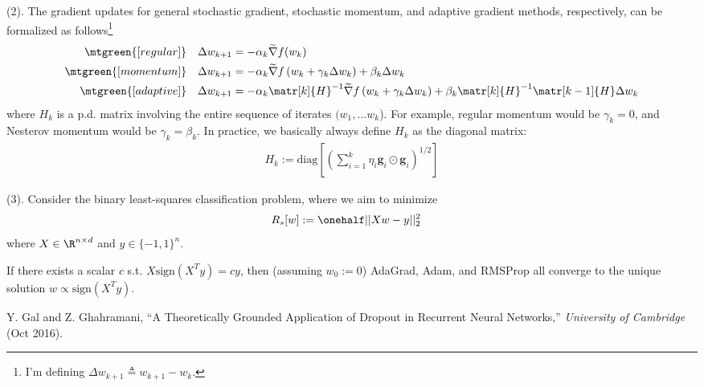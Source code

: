 \documentclass[11pt]{article}
\renewcommand\vec[2][]{\bm{#2}_{#1}}
\newcommand\myspace[1][]{\vspace{#1\bigskipamount}}
\newcommand\p{\Needspace{10\baselineskip} \noindent}
\begin{document}
\myspace
\p {} (2). The gradient updates for general stochastic gradient, stochastic momentum, and adaptive gradient methods, respectively, can be formalized as follows\footnote{I'm defining $\Delta w_{k + 1} \triangleq w_{k + 1} - w_k$.}
\begin{align}
	\mtgreen{[regular]} 	\quad	\Delta w_{k + 1} 
		&= - \alpha_k \widetilde{\nabla} f(w_k) \\
	\mtgreen{[momentum]} \quad	\Delta w_{k + 1} 
		&= - \alpha_k \widetilde{\nabla} f\left( w_k + \gamma_k   \Delta w_k    \right)
			+ \beta_k \Delta w_k \\
	\mtgreen{[adaptive]} \quad \Delta w_{k + 1}
		&= - \alpha_k \matr[k]{H}^{-1} \widetilde{\nabla} f\left( w_k + \gamma_k  \Delta w_k    \right)
			+ \beta_k \matr[k]{H}^{-1}  \matr[k - 1]{H} \Delta w_k
\end{align}
where $H_k$ is a p.d. matrix involving the entire sequence of iterates $(w_1, \ldots w_k$). For example, regular momentum would be $\gamma_k{=}0$, and Nesterov momentum would be $\gamma_k{=}\beta_k$. In practice, we basically always define $H_k$ as the diagonal matrix:
\begin{align}
	H_k := \text{diag}  \left[
		\left(
			\sum_{i=1}^k \eta_i \vec[i]{g} \odot  \vec[i]{g}
		\right)^{1/2}
	\right]
\end{align}

\myspace
\p {} (3). Consider the binary least-squares classification problem, where we aim to minimize
\begin{align}
	R_s[w] &:= \onehalf ||Xw - y||_2^2
\end{align}
where $X \in \R^{n \times d}$ and $y \in \{-1, 1\}^{n}$. 

\begin{definition}[-1em][Lemma 3.1]
	If there exists a scalar $c$ s.t. $X \text{sign}(X^T y) = cy$, then (assuming $w_0 := 0$) AdaGrad, Adam, and RMSProp all converge to the unique solution $w \propto \text{sign}(X^T y)$.
\end{definition}





\vspace{-1em}
{\footnotesize Y. Gal and Z. Ghahramani, ``A Theoretically Grounded Application of Dropout in Recurrent Neural Networks,'' \textit{University of Cambridge} (Oct 2016).}
\end{document}
